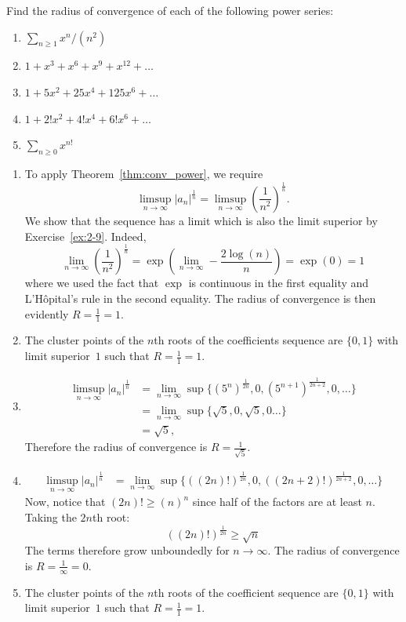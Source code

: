\begin{exercise}
    Find the radius of convergence of each of the following power series:
    \begin{enumerate}[label=(\alph*)]
        \item $\sum_{n\geq1}x^n / (n^2)$
        \item $ 1 + x^3 + x^6 + x^9 + x^{12} + \ldots$
        \item $1 + 5x^2 + 25x^4 + 125x^6 + \ldots$
        \item $1+2!x^2+4!x^4+6!x^6+\ldots$
        \item $\sum_{n\geq0}x^{n!}$
    \end{enumerate}
\end{exercise}
\begin{solution}
    \begin{enumerate}[label=(\alph*)]
        \item To apply Theorem~\ref{thm:conv_power}, we require
        \[
            \limsup_{n\to\infty} |a_n|^{\frac{1}{n}} = \limsup_{n\to\infty} \left(\frac{1}{n^2}\right)^{\frac{1}{n}}.
        \]
        We show that the sequence has a limit which is also the limit superior by Exercise~\ref{ex:2-9}. Indeed,
        \[
            \lim_{n\to\infty} \left(\frac{1}{n^2}\right)^{\frac{1}{n}} = \exp\left(\lim_{n\to\infty} -\frac{2\log(n)}{n} \right) = \exp(0) = 1
        \]
        where we used the fact that $\exp$ is continuous in the first equality and L'Hôpital's rule in the second equality. The radius of convergence is then evidently $R=\frac{1}{1}=1$.
        \item The cluster points of the $n$th roots of the coefficients sequence are $\{0, 1\}$ with limit superior~$1$ such that $R = \frac{1}{1} = 1$.
        \item \begin{align*}
            \limsup_{n\to\infty} |a_n|^{\frac{1}{n}} &= \lim_{n\to\infty} \sup \{(5^n)^{\frac{1}{2n}}, 0, (5^{n+1})^{\frac{1}{2n+2}}, 0, \ldots\} \\
            &= \lim_{n\to\infty} \sup \{\sqrt{5}, 0, \sqrt{5}, 0 \ldots\} \\
            &= \sqrt{5}
,        \end{align*}
        Therefore the radius of convergence is $R = \frac{1}{\sqrt{5}}$.
        \item \begin{align*}
            \limsup_{n\to\infty} |a_n|^{\frac{1}{n}} &= \lim_{n\to\infty} \sup \{((2n)!)^{\frac{1}{2n}}, 0, ((2n+2)!)^{\frac{1}{2n+2}}, 0,\ldots\}
        \end{align*}
        Now, notice that $(2n)! \geq \left(n\right)^n$ since half of the factors are at least $n$. Taking the $2n$th root:
        \[
            ((2n)!)^{\frac{1}{2n}} \geq \sqrt{n}
        \]
        The terms therefore grow unboundedly for $n \to\infty$. The radius of convergence is $R = \frac{1}{\infty} = 0$.
        \item The cluster points of the $n$th roots of the coefficient sequence are $\{0, 1\}$ with limit superior~$1$ such that $R = \frac{1}{1} = 1$.
    \end{enumerate}
\end{solution}

